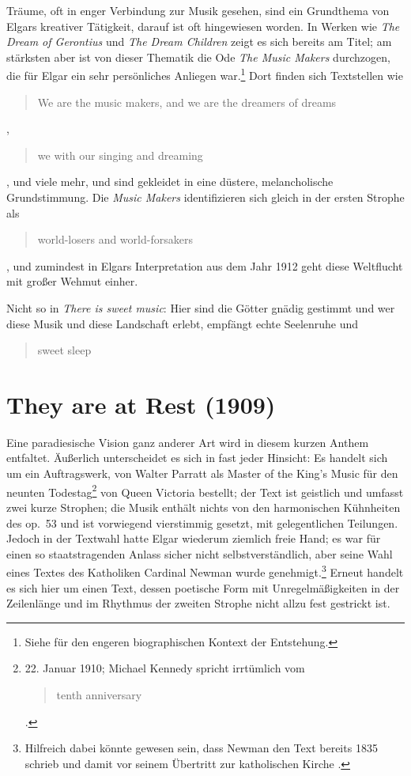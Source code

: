 \documentclass[a4paper,11pt,open=any]{scrbook}
\newcommand{\engquote}[1]{\foreignblockquote{english}{#1}}
\begin{document}
Träume, oft in enger Verbindung zur Musik gesehen, sind ein Grundthema
von Elgars kreativer Tätigkeit, darauf ist oft hingewiesen worden.  In
Werken wie \textit{The Dream of Gerontius} und \textit{The Dream Children}
zeigt es sich bereits am Titel; am stärksten aber ist von dieser Thematik
die Ode \textit{The Music Makers} durchzogen, die für Elgar ein sehr
persönliches Anliegen war.\footnote{Siehe \cite[S.~631–641,]{moore} für
den engeren biographischen Kontext der Entstehung.}  Dort finden sich
Textstellen wie \engquote{We are the music makers, and we are the dreamers
of dreams}, \engquote{we with our singing and dreaming}, und viele mehr,
und sind gekleidet in eine düstere, melancholische Grundstimmung.  Die
\textit{Music Makers} identifizieren sich gleich in der ersten Strophe als
\engquote{world-losers and world-forsakers}, und zumindest in Elgars
Interpretation aus dem Jahr 1912 geht diese Weltflucht mit großer Wehmut
einher.

Nicht so in \textit{There is sweet music}: Hier sind die Götter gnädig
gestimmt und wer diese Musik und diese Landschaft erlebt, empfängt echte
Seelenruhe und \engquote{sweet sleep}.

\section{They are at Rest \textmd{(1909)}}
Eine paradiesische Vision ganz anderer Art wird in diesem kurzen Anthem
entfaltet.  Äußerlich unterscheidet es sich in fast jeder Hinsicht: Es
handelt sich um ein Auftragswerk, von Walter Parratt als Master of the
King’s Music für den neunten Todestag\footnote{22. Januar 1910; Michael
Kennedy spricht irrtümlich vom \engquote{tenth anniversary} \parencite
[S.~114]{kennedy-life}.} von Queen Victoria bestellt; der Text ist
geistlich und umfasst zwei kurze Strophen; die Musik enthält nichts
von den harmonischen Kühnheiten des op.~53 und ist vorwiegend vierstimmig
gesetzt, mit gelegentlichen Teilungen.  Jedoch in der Textwahl hatte Elgar
wiederum ziemlich freie Hand; es war für einen so staatstragenden Anlass
sicher nicht selbstverständlich, aber seine Wahl eines Textes des Katholiken
Cardinal Newman wurde genehmigt.\footnote{Hilfreich dabei könnte gewesen
sein, dass Newman den Text bereits 1835 schrieb und damit vor seinem
Übertritt zur katholischen Kirche \parencite[S.~xiii]{ece12}.}
Erneut handelt es sich hier um einen Text,
dessen poetische Form mit Unregelmäßigkeiten in der Zeilenlänge und im
Rhythmus der zweiten Strophe nicht allzu fest gestrickt ist.
\end{document}
